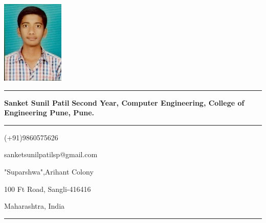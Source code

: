 \documentclass[a4paper,11pt]{article} %
\begin{document}
\raggedleft
\includegraphics{photo}
\smallskip
\hrule
\smallskip
\raggedright
\textbf{{\Huge \sc Sanket Sunil Patil \newline}}
\smallskip
\textbf{\small Second Year, Computer Engineering, College of Engineering Pune, Pune.}
\bigskip

\hrule
\smallskip
\begin{minipage}[b]{0.9\textwidth}
			\raggedleft
			(+91)9860575626\par
			sanketsunilpatilsp@gmail.com\par
		\end{minipage}%

\begin{minipage}[b]{0.33333\textwidth}
			\raggedright
			"Suparshwa",Arihant Colony\par
			100 Ft Road, Sangli-416416\par
			Maharashtra, India
		\end{minipage}

\bigskip


\hrule
\bigskip
\raggedright
\end{document}
